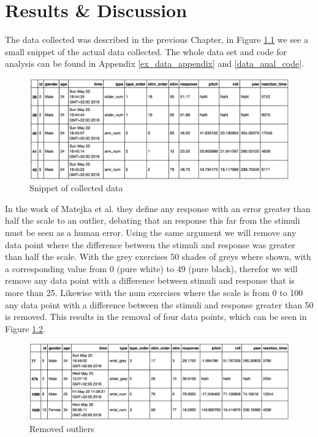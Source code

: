 \chapter{Results \& Discussion}\label{res_and_dis}\label{res_and_dis_ch}

The data collected was described in the previous Chapter, in Figure \ref{data_snip} we see a small snippet of the actual data collected. The whole data set and code for analysis can be found in Appendix \ref{ex_data_appendix} and \ref{data_anal_code}. 

\begin{figure}[]
    \centering
    \includegraphics[width=1.2\textwidth]{figures/dataExample.png}
    \caption{Snippet of collected data}
    \label{data_snip}
\end{figure}

In the work of Matejka et al.\cite{grey} they define any response with an error greater than half the scale to an outlier, debating that an response this far from the stimuli must be seen as a human error. Using the same argument we will remove any data point where the difference between the stimuli and response was greater than half the scale. With the grey exercises 50 shades of greys where shown, with a corresponding value from 0 (pure white) to 49 (pure black), therefor we will remove any data point with a difference between stimuli and response that is more than 25. Likewise with the num exercises where the scale is from 0 to 100 any data point with a difference between the stimuli and response greater than 50 is removed. This results in the removal of four data points, which can be seen in Figure \ref{outliers}. 

\begin{figure}[]
    \centering
    \includegraphics[width=1.2\textwidth]{figures/outliers.png}
    \caption{Removed outliers}
    \label{outliers}
\end{figure}

